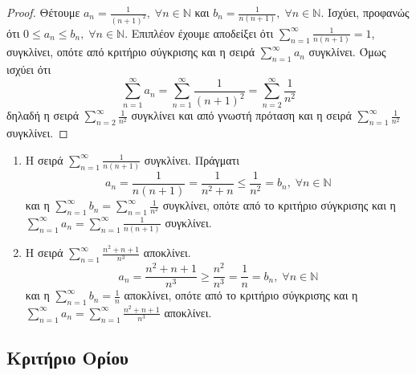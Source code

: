 
\begin{proof}
\item {}
    Θέτουμε $ a_{n} = \frac{1}{(n+1)^{2}}, \; \forall n \in \mathbb{N} $ και 
    $ b_{n} = \frac{1}{n(n+1)}, \; \forall n \in \mathbb{N} $. Ισχύει, προφανώς ότι
    $ 0 \leq a_{n} \leq b_{n}, \; \forall n \in \mathbb{N} $. Επιπλέον έχουμε αποδείξει
    ότι $ \sum_{n=1}^{\infty} \frac{1}{n(n+1)} = 1 $, συγκλίνει, οπότε από κριτήριο 
    σύγκρισης και η σειρά 
    $ \sum_{n=1}^{\infty} a_{n} $ συγκλίνει. Όμως ισχύει ότι
    \[
        \sum_{n=1}^{\infty} a_{n} = \sum_{n=1}^{\infty} \frac{1}{(n+1)^{2}} = 
        \sum_{n=2}^{\infty} \frac{1}{n^{2}} 
    \] 
    δηλαδή η σειρά $ \sum_{n=2}^{\infty} \frac{1}{n^{2}} $ συγκλίνει και από γνωστή 
    πρόταση και η σειρά $ \sum_{n=1}^{\infty} \frac{1}{n^{2}} $ συγκλίνει.
\end{proof}

\begin{examples}
\item {}
    \begin{enumerate}
        \item Η σειρά $ \sum_{n=1}^{\infty} \frac{1}{n(n+1)} $ συγκλίνει. Πράγματι
            \[
                a_{n}= \frac{1}{n(n+1)} = \frac{1}{n^{2}+n} \leq \frac{1}{n^{2}} = 
                b_{n}, \; \forall n \in \mathbb{N}
            \] 
            και η $ \sum_{n=1}^{\infty} b_{n} = \sum_{n=1}^{\infty} \frac{1}{n^{2}} $ 
            συγκλίνει, οπότε από το κριτήριο 
            σύγκρισης και η $ \sum_{n=1}^{\infty} a_{n} = \sum_{n=1}^{\infty} 
            \frac{1}{n(n+1)} $ συγκλίνει. 

        \item Η σειρά $ \sum_{n=1}^{\infty} \frac{n^{2}+n+1}{n^{3}} $ αποκλίνει. 
            \[
                a_{n} = \frac{n^{2}+n+1}{n^{3}} \geq \frac{n^{2}}{n^{3}} = \frac{1}{n} 
                = b_{n}, \; \forall n \in \mathbb{N} 
            \] 
            και η $ \sum_{n=1}^{\infty} b_{n} = \frac{1}{n} $ αποκλίνει, οπότε από 
            το κριτήριο σύγκρισης και η $ \sum_{n=1}^{\infty} a_{n} = 
            \sum_{n=1}^{\infty} \frac{n^{2}+n+1}{n^{3}} $ αποκλίνει.
    \end{enumerate}
\end{examples}

\subsection{Κριτήριο Ορίου}

